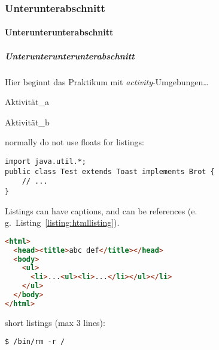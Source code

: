 \subsubsection{Unterunterabschnitt}
\lipsum[15]
\paragraph{Unterunterunterabschnitt}
\lipsum[16]
\subparagraph{Unterunterunterunterabschnitt}
\lipsum[17]

\varactivitiessection
Hier beginnt das Praktikum mit \textit{activity}-Umgebungen\dots

\lipsum[17]

\begin{varactivity}{Aktivität\_a}
    \lipsum[18-19]
\end{varactivity}

\begin{varactivity}{Aktivität\_b}
    \lipsum[20]
\end{varactivity}

normally do not use floats for listings:
\begin{lstlisting}
import java.util.*;
public class Test extends Toast implements Brot {
    // ...
}
\end{lstlisting}

Listings can have captions, and can be references (e.\,g.~Listing~\ref{listing:htmllisting}).
\begin{lstlisting}[language=HTML, caption={sourcecode in different languages possible, can have a caption}, label=listing:htmllisting]
<html>
  <head><title>abc def</title></head>
  <body>
    <ul>
      <li>...<ul><li>...</li></ul></li>
    </ul>
  </body>
</html>
\end{lstlisting}

short listings (max 3 lines):
\begin{lstlisting}[style=nonumbers]
$ /bin/rm -r /
\end{lstlisting}
